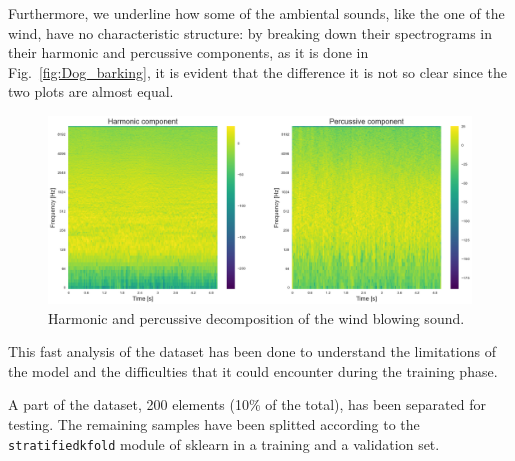 \documentclass{article}
\begin{document}
\begin{sloppy}
Furthermore, we underline how some of the ambiental sounds, like the one of the wind, have no characteristic structure: by breaking down their
spectrograms in their harmonic and percussive components, as it is done in Fig.~\ref{fig:Dog_barking}, it is evident that the difference
it is not so clear since the two plots are almost equal.

\begin{figure}[ht]
  \centering
  \centerline{\includegraphics[width=\columnwidth]{Harmonic_Percussive_Wind.png}}
  \caption{Harmonic and percussive decomposition of the wind blowing sound.}
  \label{fig:Harmonic_Percussive_Wind}
\end{figure}

This fast analysis of the dataset has been done to understand the limitations of the model and the difficulties that it could encounter during the training phase.

A part of the dataset, 200 elements (10\% of the total), has been separated for testing. The remaining samples have been splitted according to the \texttt{stratifiedkfold} module of sklearn \cite{scikit-learn_stratifiedkfold} in a training and a validation set.


\end{sloppy}
\end{document}
